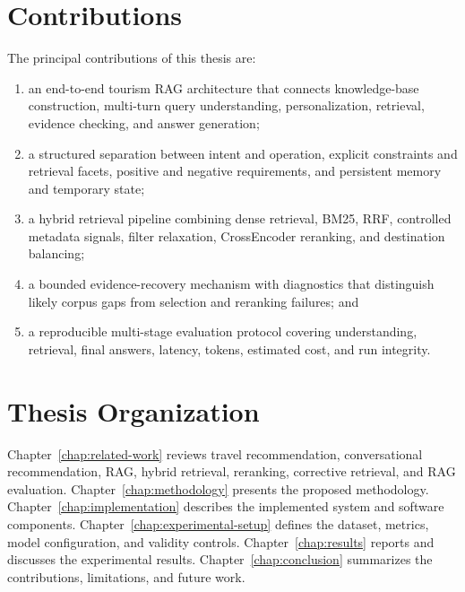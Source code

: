 \section{Contributions}

The principal contributions of this thesis are:

\begin{enumerate}[label=(\roman*)]
    \item an end-to-end tourism RAG architecture that connects knowledge-base
    construction, multi-turn query understanding, personalization, retrieval,
    evidence checking, and answer generation;

    \item a structured separation between intent and operation, explicit
    constraints and retrieval facets, positive and negative requirements, and
    persistent memory and temporary state;

    \item a hybrid retrieval pipeline combining dense retrieval, BM25, RRF,
    controlled metadata signals, filter relaxation, CrossEncoder reranking, and
    destination balancing;

    \item a bounded evidence-recovery mechanism with diagnostics that
    distinguish likely corpus gaps from selection and reranking failures; and

    \item a reproducible multi-stage evaluation protocol covering understanding,
    retrieval, final answers, latency, tokens, estimated cost, and run integrity.
\end{enumerate}

\section{Thesis Organization}

Chapter~\ref{chap:related-work} reviews travel recommendation, conversational
recommendation, RAG, hybrid retrieval, reranking, corrective retrieval, and RAG
evaluation. Chapter~\ref{chap:methodology} presents the proposed methodology.
Chapter~\ref{chap:implementation} describes the implemented system and software
components. Chapter~\ref{chap:experimental-setup} defines the dataset, metrics,
model configuration, and validity controls. Chapter~\ref{chap:results} reports
and discusses the experimental results. Chapter~\ref{chap:conclusion}
summarizes the contributions, limitations, and future work.

